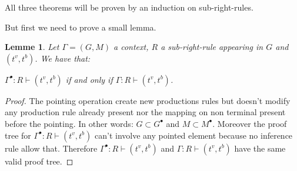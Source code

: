 \documentclass{article}
\newtheorem{proof}{Proof}
\newtheorem{lemme}{Lemme}
\begin{document}
All three theorems will be proven by an induction on sub-right-rules.

But first we need to prove a small lemma.

\begin{lemme}
Let $\Gamma = (G,M)$ a context, $R$ a sub-right-rule appearing in $G$ and $(t^v, t^b)$. We have that:

$\Gamma^{\bullet}: R \vdash (t^v,t^b)$ if and only if $\Gamma: R \vdash (t^v, t^b)$.
\end{lemme}

\begin{proof}
The pointing operation create new productions rules but doesn't modify any production rule already present nor the mapping on non terminal present before the pointing. In other words: $G \subset G^{\bullet}$ and $M \subset M^{\bullet}$. Moreover the proof tree for $\Gamma^{\bullet}: R \vdash (t^v,t^b)$ can't involve any pointed element because no inference rule allow that. Therefore $\Gamma^{\bullet}: R \vdash (t^v,t^b)$ and $\Gamma: R \vdash (t^v, t^b)$ have the same valid proof tree.
\end{proof}
\end{document}
